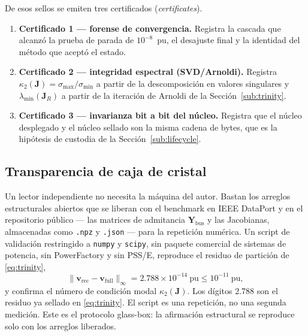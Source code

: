 De esos sellos se emiten tres certificados (\emph{certificates}).
\begin{enumerate}
\item \textbf{Certificado 1 --- forense de convergencia.} Registra la cascada que alcanzó la prueba de parada de $10^{-8}$~pu, el desajuste final y la identidad del método que aceptó el estado.
\item \textbf{Certificado 2 --- integridad espectral (SVD/Arnoldi).} Registra $\kappa_2(\mathbf{J})=\sigma_{\max}/\sigma_{\min}$ a partir de la descomposición en valores singulares y $\lambda_{\min}(\mathbf{J}_R)$ a partir de la iteración de Arnoldi de la Sección~\ref{sub:trinity}.
\item \textbf{Certificado 3 --- invarianza bit a bit del núcleo.} Registra que el núcleo desplegado y el núcleo sellado son la misma cadena de bytes, que es la hipótesis de custodia de la Sección~\ref{sub:lifecycle}.
\end{enumerate}

\subsection{Transparencia de caja de cristal}
\label{sub:glassbox}

Un lector independiente no necesita la máquina del autor. Bastan los arreglos estructurales abiertos que se liberan con el benchmark en IEEE DataPort y en el repositorio público --- las matrices de admitancia $\mathbf{Y}_{\mathrm{bus}}$ y las Jacobianas, almacenadas como \texttt{.npz} y \texttt{.json} --- para la repetición numérica. Un script de validación restringido a \texttt{numpy} y \texttt{scipy}, sin paquete comercial de sistemas de potencia, sin PowerFactory y sin PSS/E, reproduce el residuo de partición de \eqref{eq:trinity},
\begin{equation*}
\|\mathbf{v}_{\mathrm{rec}}-\mathbf{v}_{\mathrm{full}}\|_\infty = 2.788 \times 10^{-14}\ \mathrm{pu} \le 10^{-11}\ \mathrm{pu},
\end{equation*}
y confirma el número de condición modal $\kappa_2(\mathbf{J})$. Los dígitos 2.788 son el residuo ya sellado en \eqref{eq:trinity}. El script es una repetición, no una segunda medición. Este es el protocolo glass-box: la afirmación estructural se reproduce solo con los arreglos liberados.

